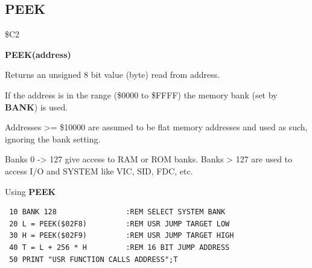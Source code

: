 
\newpage
\subsection{PEEK}
\begin{description}[leftmargin=2cm,style=nextline]
\item [Token:] \$C2
\item [Format:] {\bf PEEK(address)}
\item [Usage:]  Returns an unsigned 8 bit value (byte)
                read from address.

                If the address is in the range (\$0000 to \$FFFF) the
                memory bank (set by {\bf BANK}) is used.

                Addresses >= \$10000 are assumed to be flat memory
                addresses and used as such, ignoring the bank setting.

\item [Remarks:] Banks 0 -> 127 give access to RAM or ROM banks.
                 Banks > 127 are used to access I/O and SYSTEM
                 like VIC, SID, FDC, etc.
\item [Example:] Using {\bf PEEK}

\begin{tcolorbox}[colback=black,coltext=white]
\verbatimfont{\codefont}
\begin{verbatim}
 10 BANK 128                :REM SELECT SYSTEM BANK
 20 L = PEEK($02F8)         :REM USR JUMP TARGET LOW
 30 H = PEEK($02F9)         :REM USR JUMP TARGET HIGH
 40 T = L + 256 * H         :REM 16 BIT JUMP ADDRESS
 50 PRINT "USR FUNCTION CALLS ADDRESS";T
\end{verbatim}
\end{tcolorbox}
\end{description}


\newpage
